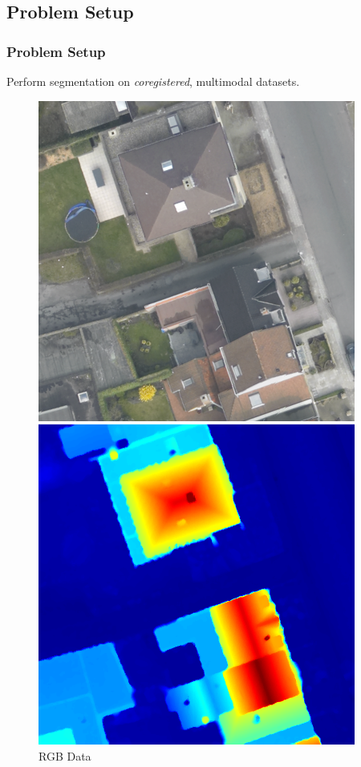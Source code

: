 \documentclass{beamer}
\begin{document}
\subsection{Problem Setup}
\begin{frame}
  \frametitle{Problem Setup}
  Perform segmentation on \emph{coregistered}, multimodal datasets.\\ \cite{Iyer2017}
  \begin{figure}
    \hfill
    \begin{minipage}[b]{0.40\linewidth}
      \centering
      \includegraphics[width=\textwidth]{./Images/DFC2015/optical.png}
      \caption{RGB Data}
    \end{minipage}
    \hfill
    \begin{minipage}[b]{0.40\linewidth}
      \centering
      \includegraphics[width=\textwidth]{./Images/DFC2015/lidarColor.png}

\end{minipage}
\end{figure}
\end{frame}
\end{document}
